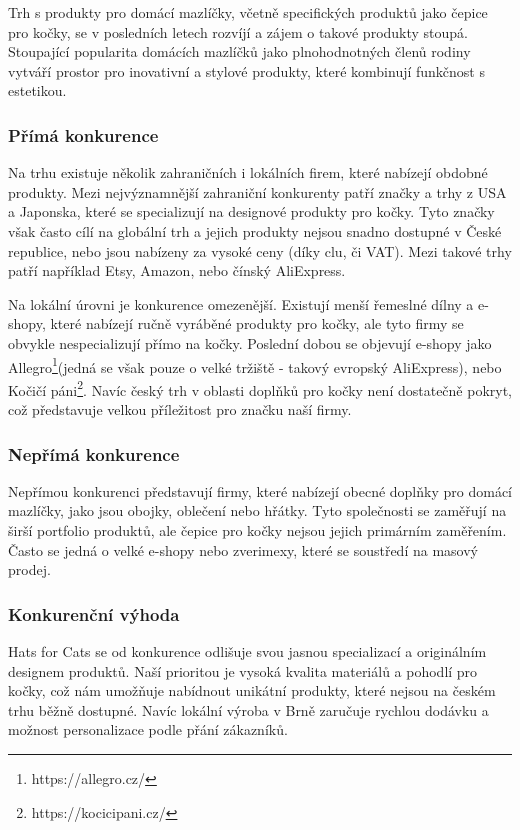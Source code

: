 \documentclass[12pt, a4paper]{article}
\begin{document}
Trh s produkty pro domácí mazlíčky, včetně specifických produktů jako čepice pro kočky, se v posledních letech rozvíjí a zájem o takové produkty stoupá.
Stoupající popularita domácích mazlíčků jako plnohodnotných členů rodiny vytváří prostor pro inovativní a stylové produkty, které kombinují funkčnost s estetikou.

\subsubsection{Přímá konkurence\cite{prima-konkurence}}
Na trhu existuje několik zahraničních i lokálních firem, které nabízejí obdobné produkty.
Mezi nejvýznamnější zahraniční konkurenty patří značky a trhy z USA a Japonska, které se specializují na designové produkty pro kočky.
Tyto značky však často cílí na globální trh a jejich produkty nejsou snadno dostupné v České republice, nebo jsou nabízeny za vysoké ceny
(díky clu, či VAT). Mezi takové trhy patří například Etsy, Amazon, nebo čínský AliExpress.

Na lokální úrovni je konkurence omezenější.
Existují menší řemeslné dílny a e-shopy, které nabízejí ručně vyráběné produkty pro kočky, ale tyto firmy se obvykle nespecializují přímo na kočky.
Poslední dobou se objevují e-shopy jako Allegro\footnote{https://allegro.cz/}(jedná se však pouze o velké tržiště - takový evropský AliExpress), nebo Kočičí páni\footnote{https://kocicipani.cz/}.
Navíc český trh v oblasti doplňků pro kočky není dostatečně pokryt, což představuje velkou příležitost pro značku naší firmy.

\subsubsection{Nepřímá konkurence\cite{neprima-konkurence}}
Nepřímou konkurenci představují firmy, které nabízejí obecné doplňky pro domácí mazlíčky, jako jsou obojky, oblečení nebo hřátky.
Tyto společnosti se zaměřují na širší portfolio produktů, ale čepice pro kočky nejsou jejich primárním zaměřením. Často se jedná o velké e-shopy nebo zverimexy, které se soustředí na masový prodej.

\subsubsection{Konkurenční výhoda}
Hats for Cats se od konkurence odlišuje svou jasnou specializací a originálním designem produktů. Naší prioritou je vysoká kvalita materiálů a pohodlí pro kočky,
což nám umožňuje nabídnout unikátní produkty, které nejsou na českém trhu běžně dostupné.
Navíc lokální výroba v Brně zaručuje rychlou dodávku a možnost personalizace podle přání zákazníků.
\end{document}
